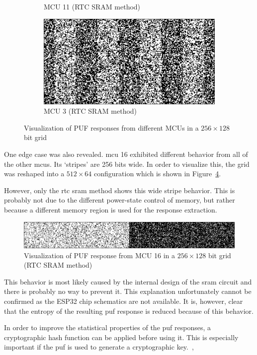 \begin{figure}[ht!]
\begin{subfigure}[b]{0.475\textwidth}
            \caption{MCU 11 (RTC SRAM method)}    
            \label{fig:mcu_11}
        \end{subfigure}
        \hfill
        \begin{subfigure}[b]{0.475\textwidth}   
            \centering 
            \includegraphics[width=\textwidth]{images/3_response_rtc.png}
            \caption{MCU 3 (RTC SRAM method)}    
            \label{fig:mcu_3}
        \end{subfigure}
        \caption{Visualization of PUF responses from different MCUs in a $256 \times 128$ bit grid} 
        \label{fig:puf_response_visualization}
\end{figure}

One edge case was also revealed. \Gls{mcu} 16 exhibited different behavior from all of the other \glspl{mcu}. Its `stripes' are 256 bits wide. In order to visualize this, the grid was reshaped into a $512 \times 64$ configuration which is shown in Figure~\ref{fig:16_response_sleep}.

However, only the \gls{rtc} \gls{sram} method shows this wide stripe behavior. This is probably not due to the different power-state control of memory, but rather because a different memory region is used for the response extraction.

\begin{figure}[ht!]
    \centering
    \captionsetup{justification=centering,margin=0.5cm}
    \includegraphics[width=\textwidth]{images/16_response_sleep.png}
    \caption{Visualization of PUF response from MCU 16 in a $256 \times 128$ bit grid (RTC SRAM method)}
    \label{fig:16_response_sleep}
\end{figure}

This behavior is most likely caused by the internal design of the \gls{sram} circuit and there is probably no way to prevent it. This explanation unfortunately cannot be confirmed as the ESP32 chip schematics are not available. It is, however, clear that the entropy of the resulting \gls{puf} response is reduced because of this behavior.

In order to improve the statistical properties of the \gls{puf} responses, a cryptographic hash function can be applied before using it. This is especially important if the \gls{puf} is used to generate a cryptographic key.~\cite{Sven2015},~\cite{Dodis2008}

